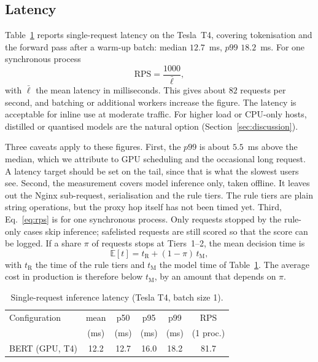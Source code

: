 \documentclass[preprint,11pt]{elsarticle}
\let\footnotesize\normalsize
\begin{document}
\subsection{Latency}
Table~\ref{tab:latency} reports single-request latency on the Tesla~T4,
covering tokenisation and the forward pass after a warm-up batch: median
$12.7$~ms, $p99$ $18.2$~ms. For one synchronous process
\begin{equation}
\mathrm{RPS} = \frac{1000}{\bar\ell},
\label{eq:rps}
\end{equation}
with $\bar\ell$ the mean latency in milliseconds. This gives about $82$
requests per second, and batching or additional workers increase the
figure. The latency is acceptable for inline use at moderate traffic. For
higher load or CPU-only hosts, distilled or quantised models are the
natural option (Section~\ref{sec:discussion}).

Three caveats apply to these figures. First, the $p99$ is about $5.5$~ms
above the median, which we attribute to GPU scheduling and the occasional
long request. A latency target should be set on the tail, since that is
what the slowest users see. Second, the measurement covers model inference
only, taken offline. It leaves out the Nginx sub-request, serialisation and
the rule tiers. The rule tiers are plain string operations, but the proxy
hop itself has not been timed yet. Third, Eq.~\eqref{eq:rps} is for one
synchronous process. Only requests stopped by the rule-only cases skip
inference; safelisted requests are still scored so that the score can be
logged. If a share $\pi$ of requests stops at Tiers~1--2, the mean decision
time is
\begin{equation}
\mathbb{E}[t]=t_{\text{R}}+(1-\pi)\,t_{\text{M}},
\label{eq:cost}
\end{equation}
with $t_{\text{R}}$ the time of the rule tiers and $t_{\text{M}}$ the model
time of Table~\ref{tab:latency}. The average cost in production is
therefore below $t_{\text{M}}$, by an amount that depends on $\pi$.

\begin{table}[t]
\centering
\footnotesize
\caption{Single-request inference latency (Tesla T4, batch size 1).}
\label{tab:latency}
\begin{tabular}{@{}lccccc@{}}
\toprule
Configuration & mean & p50 & p95 & p99 & RPS \\
 & (ms) & (ms) & (ms) & (ms) & (1 proc.) \\
\midrule
BERT (GPU, T4) & 12.2 & 12.7 & 16.0 & 18.2 & 81.7 \\
\bottomrule
\end{tabular}
\end{table}
\end{document}
